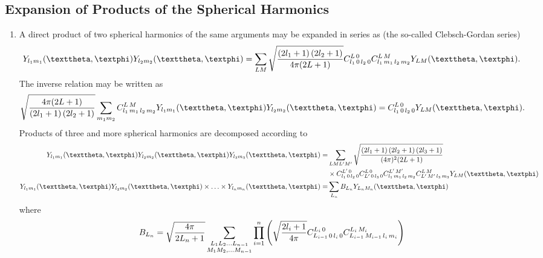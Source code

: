 \subsection{Expansion of Products of the Spherical Harmonics}\label{sec:5.6.2}
\begin{enumerate}[label=(\alph*)]
\item A direct product of two spherical harmonics of the same arguments may be expanded in series as (the so-called Clebsch-Gordan series)
\begin{equation}
Y_{l_{1} m_{1}}(\vartheta, \varphi) Y_{l_{2} m_{2}}(\vartheta, \varphi)=\sum_{L M} \sqrt{\frac{\left(2 l_{1}+1\right)\left(2 l_{2}+1\right)}{4 \pi(2 L+1)}} \clebsch{l_{1}}{0}{l_{2}}{0}{L}{0} \clebsch{l_{1}}{m_{1}}{l_{2}}{m_{2}}{L}{M} Y_{L M}(\vartheta, \varphi) . \label{eq:5:6:9}
\end{equation}
The inverse relation may be written as
\begin{equation}
\sqrt{\frac{4 \pi(2 L+1)}{\left(2 l_{1}+1\right)\left(2 l_{2}+1\right)}} \sum_{m_{1} m_{2}} \clebsch{l_{1}}{m_{1}}{l_{2}}{m_{2}}{L}{M} Y_{l_{1} m_{1}}(\vartheta, \varphi) Y_{l_{2} m_{2}}(\vartheta, \varphi)=\clebsch{l_{1}}{0}{l_{2}}{0}{L}{0} Y_{L M}(\vartheta, \varphi) . \label{eq:5:6:10}
\end{equation}
Products of three and more spherical harmonics are decomposed according to
\begin{align}
Y_{l_{1} m_{1}}(\vartheta, \varphi) Y_{l_{2} m_{2}}(\vartheta, \varphi) Y_{l_{3} m_{3}}(\vartheta, \varphi)=&\sum_{L M L^{\prime} M^{\prime}} \sqrt{\frac{\left(2 l_{1}+1\right)\left(2 l_{2}+1\right)\left(2 l_{3}+1\right)}{(4 \pi)^{2}(2 L+1)}}  \notag\\
&\times \clebsch{l_{1}}{0}{l_{2}}{0}{L^{\prime}}{0} \clebsch{L^{\prime}}{0}{l_{3}}{0}{L}{0} \clebsch{l_{1}}{m_{1}}{l_{2}}{m_{2}}{L^{\prime}}{M^{\prime}} \clebsch{L^{\prime}}{M^{\prime}}{l_{3}}{m_{3}}{L}{M} Y_{L M}(\vartheta, \varphi)  \label{eq:5:6:11}\\
Y_{l_{1} m_{1}}(\vartheta, \varphi) Y_{l_{2} m_{2}}(\vartheta, \varphi) \times \ldots \times Y_{l_{n} m_{n}}(\vartheta, \varphi)=&\sum_{L_{n}} B_{L_{n}} Y_{L_{n} M_{n}}(\vartheta, \varphi) \label{eq:5:6:12}
\end{align}
where
\begin{equation}
B_{L_{n}}=\sqrt{\frac{4 \pi}{2 L_{n}+1}} \sum_{\substack{L_{1} L_{2} \ldots L_{n-1} \\ M_{1} M_{2}, \ldots M_{n-1}}} \prod_{i=1}^{n}\left(\sqrt{\frac{2 l_{i}+1}{4 \pi}} \clebsch{L_{i-1}}{0}{l_{i}}{0}{L_{i}}{0} \clebsch{L_{i-1}}{M_{i-1}}{l_{i}}{m_{i}}{L_{i}}{M_{i}}\right) \label{eq:5:6:13}

\end{equation}
\end{enumerate}
